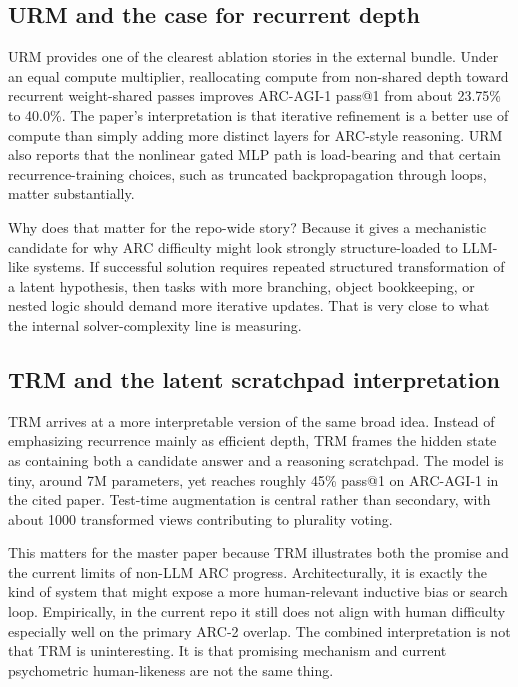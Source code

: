 \documentclass[11pt,letterpaper]{article}
\begin{document}
\subsection{URM and the case for recurrent depth}

URM provides one of the clearest ablation stories in the external bundle. Under an equal compute multiplier, reallocating compute from non-shared depth toward recurrent weight-shared passes improves ARC-AGI-1 pass@1 from about 23.75\% to 40.0\%. The paper's interpretation is that iterative refinement is a better use of compute than simply adding more distinct layers for ARC-style reasoning. URM also reports that the nonlinear gated MLP path is load-bearing and that certain recurrence-training choices, such as truncated backpropagation through loops, matter substantially.

Why does that matter for the repo-wide story? Because it gives a mechanistic candidate for why ARC difficulty might look strongly structure-loaded to LLM-like systems. If successful solution requires repeated structured transformation of a latent hypothesis, then tasks with more branching, object bookkeeping, or nested logic should demand more iterative updates. That is very close to what the internal solver-complexity line is measuring.

\subsection{TRM and the latent scratchpad interpretation}

TRM arrives at a more interpretable version of the same broad idea. Instead of emphasizing recurrence mainly as efficient depth, TRM frames the hidden state as containing both a candidate answer and a reasoning scratchpad. The model is tiny, around 7M parameters, yet reaches roughly 45\% pass@1 on ARC-AGI-1 in the cited paper. Test-time augmentation is central rather than secondary, with about 1000 transformed views contributing to plurality voting.

This matters for the master paper because TRM illustrates both the promise and the current limits of non-LLM ARC progress. Architecturally, it is exactly the kind of system that might expose a more human-relevant inductive bias or search loop. Empirically, in the current repo it still does not align with human difficulty especially well on the primary ARC-2 overlap. The combined interpretation is not that TRM is uninteresting. It is that promising mechanism and current psychometric human-likeness are not the same thing.
\end{document}
